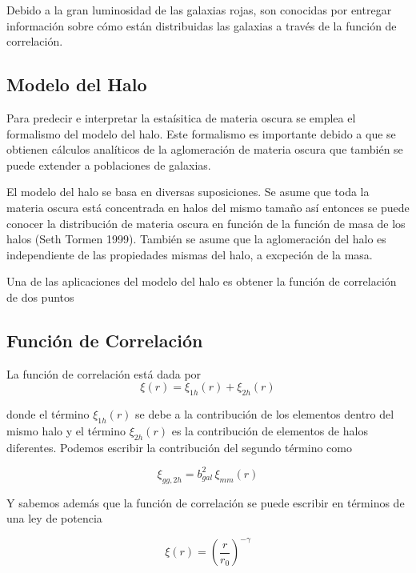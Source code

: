 \documentclass[twocolumn,letterpaper,spanish]{revtex4}
\numberwithin{equation}{section}
\begin{document}
Debido a la gran luminosidad de las galaxias rojas, son conocidas por entregar informaci\'on sobre c\'omo est\'an distribuidas las galaxias a trav\'es de la funci\'on de correlaci\'on.


\subsection{Modelo del Halo}

Para predecir e interpretar la esta\'isitica de materia oscura se emplea el formalismo del modelo del halo. Este formalismo es importante debido a que se obtienen c\'alculos anal\'iticos de la aglomeraci\'on de materia oscura que tambi\'en se puede extender a poblaciones de galaxias.

El modelo del halo se basa en diversas suposiciones. Se asume que toda la materia oscura est\'a concentrada en halos del mismo tama\~no as\'i entonces se puede conocer la distribuci\'on de materia oscura en funci\'on de la funci\'on de masa de los halos (Seth Tormen  1999). Tambi\'en se asume que la aglomeraci\'on del halo es independiente de las propiedades mismas del halo, a excpeci\'on de la masa.

Una de las aplicaciones del modelo del halo es obtener la funci\'on de correlaci\'on de dos puntos

\subsection{Funci\'on de Correlaci\'on}

La funci\'on de correlaci\'on est\'a dada por
\begin{equation}
\xi(r)=\xi_{1h}(r)+\xi_{2h}(r)
\end{equation}

donde el t\'ermino $\xi_{1h}(r)$ se debe a la contribuci\'on de los elementos dentro del mismo halo y  el t\'ermino $\xi_{2h}(r)$ es la contribuci\'on de elementos de halos diferentes.
Podemos escribir la contribuci\'on del segundo t\'ermino como

\begin{equation}
\xi_{gg,2h}=b^2_{gal}\,\xi_{mm}(r)
\end{equation}

Y sabemos adem\'as que la funci\'on de correlaci\'on se puede escribir en t\'erminos de una ley de potencia

\begin{equation}
\xi(r)=\left(\frac{r}{r_0}\right)^{-\gamma}
\end{equation}
\end{document}
